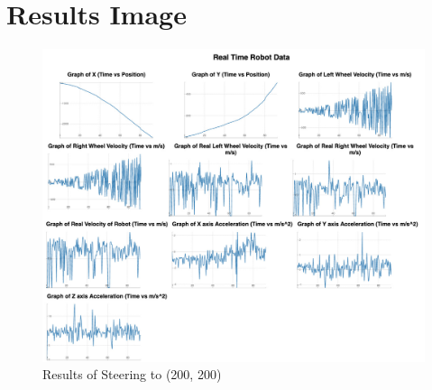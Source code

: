 \documentclass[conference]{IEEEtran}
\begin{document}
\section{Results Image}

\begin{figure}[H]
    \centering
    \captionsetup{justification=centering}
    \centering
    \includegraphics[width=6in]{14.jpg}
    \caption{Results of Steering to (200, 200)}  
    \label{6}
\end{figure}
\end{document}
